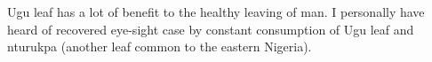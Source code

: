 
Ugu leaf has a lot of benefit to the healthy leaving of man. I personally have heard of recovered eye-sight case by constant consumption of Ugu leaf and nturukpa (another leaf common to the eastern Nigeria). 
